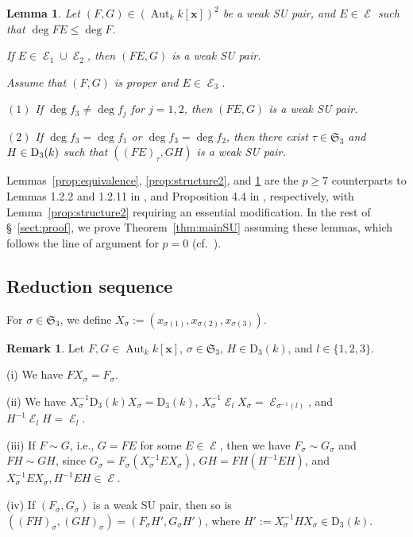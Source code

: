 \documentclass{amsart}
\theoremstyle{plain}
\newtheorem{llem}{Lemma}
\theoremstyle{definition}
\newtheorem{rem}[thm]{Remark}
\newcommand{\E }{{\mathop{\mathcal{E}}\nolimits}}
\renewcommand{\rightsquigarrow }{\mathbin{\sim}}
\newcommand{\Aut }{\mathop{\mathrm{Aut}}\nolimits}
\newcommand{\D }{\mathrm{D}}
\newcommand{\nd}{\noindent}
\newcommand{\x}{{\boldsymbol x}}
\newcommand{\kx}{k[\x]}
\newcommand{\sym}{\mathfrak{S}}
\begin{document}
\begin{llem}\label{prop:c1-c6}
Let $(F,G)\in (\Aut _k\kx )^2$ be a weak SU pair, 
and $E\in \E $ such that $\deg FE\leq \deg F$. 


\nd{\rm (i)} 
If $E\in \E _1\cup \E _2$, 
then $(FE,G)$ is a weak SU pair. 



\nd{\rm (ii)} 
Assume that $(F,G)$ is proper and $E\in \E _3$. 


\nd $(1)$ If $\deg f_3\ne \deg f_j$ for $j=1,2$, 
then $(FE,G)$ is a weak SU pair. 


\nd $(2)$ If $\deg f_3=\deg f_1$ or $\deg f_3=\deg f_2$, 
then there exist $\tau \in \sym _3$ and $H\in {\rm D}_3(k)$ 
such that $((FE)_\tau ,GH)$ is a weak SU pair. 

\end{llem}




Lemmas~\ref{prop:equivalence}, \ref{prop:structure2}, 
and \ref{prop:c1-c6} 
are the $p\ge 7$ counterparts to 
Lemmas 1.2.2 and 1.2.11 in \cite{JC}, 
and Proposition 4.4 in \cite{tame3}, respectively, 
with Lemma~\ref{prop:structure2} requiring an essential modification. 
In the rest of \S ~\ref{sect:proof}, 
we prove Theorem~\ref{thm:mainSU} assuming these lemmas, 
which follows the line of argument for $p=0$ 
(cf.\ \cite[\S~1.2]{JC}). 



\subsection{Reduction sequence}\label{subsect:AA}
For $\sigma \in \sym _3$, 
we define 
$X_\sigma :=(x_{\sigma (1)},x_{\sigma (2)},x_{\sigma (3)})$. 



\begin{rem}\label{rem:Xsigma}\rm 
Let $F,G\in \Aut _k\kx $, 
$\sigma \in \sym _3$, $H\in \D _3(k)$, 
and $l\in \{ 1,2,3\} $. 

\nd (i) We have $FX_\sigma =F_\sigma $. 


\nd (ii) 
We have 
$X_{\sigma }^{-1}\D _3(k)X_{\sigma }=\D_3(k)$, 
$X_{\sigma }^{-1}\E _lX_{\sigma }=\E _{\sigma ^{-1}(l)}$, 
and $H^{-1}\E _lH=\E _l$. 



\nd (iii) If $F\rightsquigarrow G$, 
i.e., 
$G=FE$ for some $E\in \E $, 
then we have 
$F_\sigma \rightsquigarrow G_\sigma $ and $FH\rightsquigarrow GH$, 
since 
$G_\sigma =F_\sigma (X_\sigma ^{-1}EX_\sigma )$, $GH=FH(H^{-1}EH)$, 
and $X_\sigma ^{-1}EX_\sigma ,H^{-1}EH\in \E $. 

\nd (iv) 
If $(F_\sigma ,G_\sigma )$ is a weak SU pair, 
then so is $((FH)_\sigma ,(GH)_\sigma )
=(F_\sigma H',G_\sigma H')$, 
where $H':=X_\sigma ^{-1}HX_\sigma \in \D_3(k)$. 
\end{rem}
\end{document}
